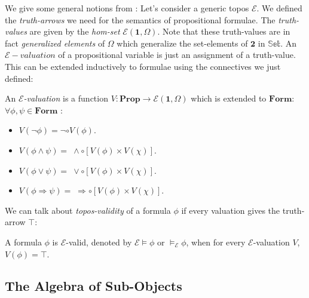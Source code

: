\newpage
We give some general notions from \cite{goldblatt}: \newline
\newline
Let's consider a generic topos $\mathcal{E}$. \newline
We defined the \emph{truth-arrows} we need for the semantics of propositional formulae.  \newline
The \emph{truth-values} are given by the \emph{hom-set} $\mathcal{E}(\textbf{1},\Omega)$. \newline Note that these truth-values are in fact \emph{generalized elements} of $\Omega$ which generalize the set-elements of $\mathbf{2}$ in $\mathbb{Set}$. \newline
An \emph{$\mathcal{E}-valuation$} of a propositional variable is just an assignment of a truth-value. This can be extended inductively to formulae using the connectives we just defined:

\begin{definition}
	An \emph{$\mathcal{E}$-valuation} is a function $V : \mathbf{Prop} \rightarrow \mathcal{E}(\mathbf{1},\Omega)$ which is extended to $\mathbf{Form}$: \newline
	  $\forall \phi,\psi \in \mathbf{Form}$ :
	\begin{itemize}
		\item $V(\neg \phi) = \neg \circ V(\phi)$.
		\item $V(\phi \land \psi) =\; \land \circ  [V(\phi)\times V(\chi)] $.
		\item $V(\phi \lor \psi) =\; \lor \circ  [V(\phi)\times V(\chi)] $.
		\item $V(\phi \Rightarrow \psi) =\; \Rightarrow \circ  [V(\phi)\times V(\chi)] $.
	\end{itemize}
\end{definition}

We can talk about \emph{topos-validity} of a formula $\phi$ if every valuation gives the truth-arrow $\top$:

\begin{definition}
	A formula $\phi$ is $\mathcal{E}$-valid, denoted by $\mathcal{E} \models \phi$ or $\models_\mathcal{E}  \phi$, when for every $\mathcal{E}$-valuation $V$, $V(\phi)=\top$.  
\end{definition} 




\newpage
\subsection{The Algebra of Sub-Objects}

